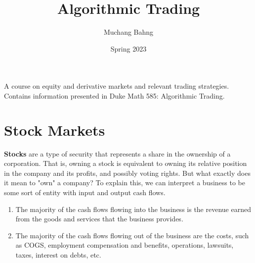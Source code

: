 \documentclass{article}
\begin{document}
\title{Algorithmic Trading}
\author{Muchang Bahng}
\date{Spring 2023}

\maketitle
\tableofcontents
\pagebreak

A course on equity and derivative markets and relevant trading strategies. Contains information presented in Duke Math 585: Algorithmic Trading. 

\section{Stock Markets}

\textbf{Stocks} are a type of security that represents a share in the ownership of a corporation. That is, owning a stock is equivalent to owning its relative position in the company and its profits, and possibly voting rights. But what exactly does it mean to "own" a company? To explain this, we can interpret a business to be some sort of entity with input and output cash flows.

\begin{enumerate}
    \item The majority of the cash flows flowing into the business is the revenue earned from the goods and services that the business provides. 
    \item The majority of the cash flows flowing out of the business are the costs, such as COGS, employment compensation and benefits, operations, lawsuits, taxes, interest on debts, etc.
\end{enumerate}
\end{document}
